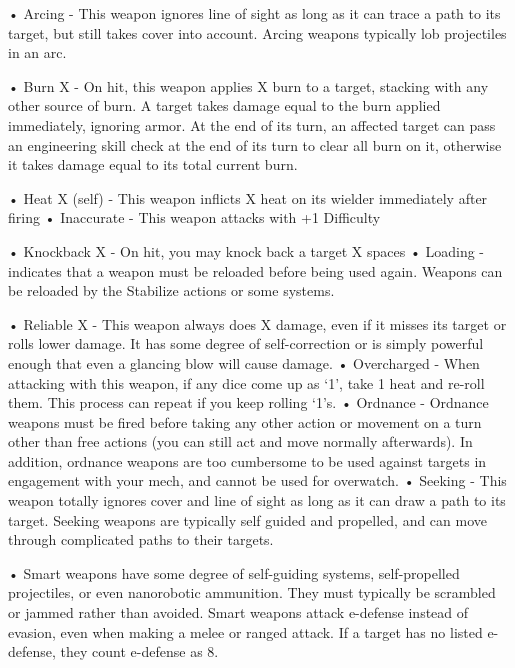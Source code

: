 •  \hypertarget{Arcing}{Arcing} - This weapon ignores line of sight as long as it can trace a path to its target, but still
  takes cover into account. Arcing weapons typically lob projectiles in an arc.

•  \hypertarget{Burn}{Burn X} - On hit, this weapon applies X burn to a target, stacking with any other source of burn.
  A target takes damage equal to the burn applied immediately, ignoring armor. At the end of its
  turn, an affected target can pass an engineering skill check at the end of its turn to clear all
  burn on it, otherwise it takes damage equal to its total current burn.





•  \hypertarget{HeatSelf}{Heat X (self)} - This weapon inflicts X heat on its wielder immediately after firing
•  \hypertarget{Inaccurate}{Inaccurate} - This weapon attacks with +1 Difficulty

•  \hypertarget{Knockback}{Knockback X} - On hit, you may knock back a target X spaces
•  \hypertarget{Loading}{Loading} - indicates that a weapon must be reloaded before being used again. Weapons can
  be reloaded by the Stabilize actions or some systems.

•  \hypertarget{Reliable}{Reliable X} - This weapon always does X damage, even if it misses its target or rolls lower
  damage. It has some degree of self-correction or is simply powerful enough that even a
  glancing blow will cause damage.
•  \hypertarget{Overcharged}{Overcharged} - When attacking with this weapon, if any dice come up as ‘1’, take 1 heat and
  re-roll them. This process can repeat if you keep rolling ‘1’s.
•  \hypertarget{Ordnance}{Ordnance} - Ordnance weapons must be fired before taking any other action or movement on a
  turn other than free actions (you can still act and move normally afterwards). In addition,
  ordnance weapons are too cumbersome to be used against targets in engagement with your
  mech, and cannot be used for overwatch.
•  \hypertarget{Seeking}{Seeking} - This weapon totally ignores cover and line of sight as long as it can draw a path to
  its target. Seeking weapons are typically self guided and propelled, and can move through
  complicated paths to their targets.

•  \hypertarget{Smart}{Smart} weapons have some degree of self-guiding systems, self-propelled projectiles, or even
  nanorobotic ammunition. They must typically be scrambled or jammed rather than avoided.
  Smart weapons attack e-defense instead of evasion, even when making a melee or ranged
  attack. If a target has no listed e-defense, they count e-defense as 8.

